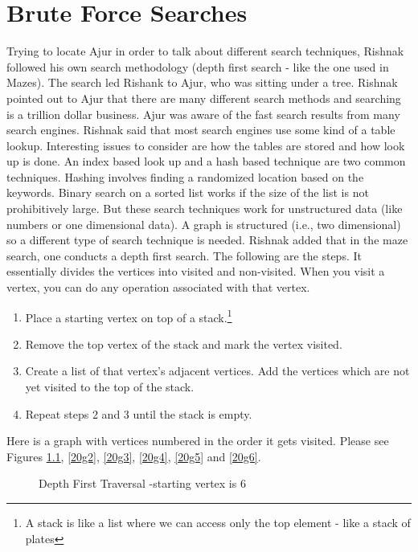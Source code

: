 \chapter{Brute Force Searches}

Trying to locate Ajur in order to talk about different search techniques, Rishnak followed his own search methodology (depth first search - like the one used in Mazes). The search led Rishank to Ajur, who was sitting under a tree. Rishnak pointed out to Ajur that there are many different search methods and searching is a trillion dollar business. Ajur was aware of the fast search results from many search engines. Rishnak said that most search engines use some kind of a table lookup. Interesting issues to consider are how the tables are stored and how look up is done.  An index based look up and a hash based technique are two common techniques. Hashing involves finding a randomized location based on the keywords.  Binary search on a sorted list works if the size of the list is not prohibitively large. But these search techniques work for unstructured data (like numbers or one dimensional data). A graph is structured (i.e., two dimensional) so a different type of search technique is needed.
Rishnak added that in the maze search, one conducts a depth first search. The following are the steps. It essentially divides the vertices into visited and non-visited. When you visit a vertex, you can do any
operation associated with that vertex.

\begin{enumerate}
    \item Place a starting vertex on top of a stack.\footnote{A stack is like a list where we can access only the top element - like a stack of plates}
     \item Remove the top vertex of the stack and mark the vertex visited.
     \item Create a list of that vertex's adjacent vertices. Add the vertices which are not yet visited  to the top of the stack.
     \item Repeat steps 2 and 3 until the stack is empty.
\end{enumerate}

Here is a graph with vertices numbered in the order it gets visited. Please see Figures \ref{20g1}, \ref{20g2}, \ref{20g3}, \ref{20g4}, \ref{20g5} and \ref{20g6}. 
\begin{figure}
\begin{center}
\caption{ Depth First Traversal -starting vertex is 6}\label{20g1}
\end{center}
\end{figure}

